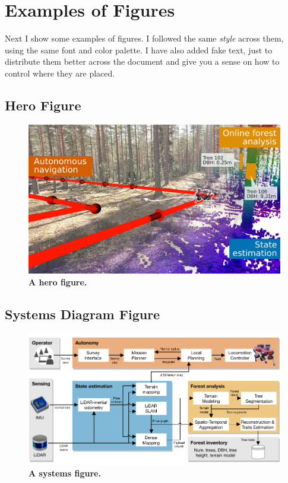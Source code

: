 \documentclass[letterpaper, 10 pt, conference]{ieeeconf}  %
\begin{document}
\section{Examples of Figures}
Next I show some examples of figures. I followed the same \emph{style} across them, using the same font and color palette.
I have also added fake text, just to distribute them better across the document and give you a sense on how to control where they are placed.


\subsection{Hero Figure}
{\color{gray}{\lipsum[1-5]}}
\begin{figure}[t]
    \centering
    \includegraphics[width=\columnwidth]{figs/depiction.png}
    \caption{\textbf{A hero figure.}}
    \label{fig:hero-figure-single}
\end{figure}

\subsection{Systems Diagram Figure}
{\color{gray}{\lipsum[1-5]}}

\begin{figure}[t]
    \centering
    \includegraphics[width=\columnwidth]{figs/system_overview.pdf}
    \caption{\textbf{A systems figure.}}
    \label{fig:systems-figure-single}
\end{figure}
\end{document}
